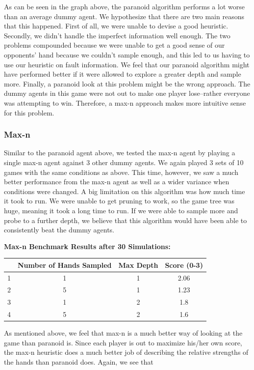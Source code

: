 \documentclass[11pt]{article}
\begin{document}
As can be seen in the graph above, the paranoid algorithm performs a lot worse than an average dummy agent. We hypothesize that there are two main reasons that this happened. First of all, we were unable to devise a good heuristic. Secondly, we didn't handle the imperfect information well enough. The two problems compounded because we were unable to get a good sense of our opponents' hand because we couldn't sample enough, and this led to us having to use our heuristic on fault information. We feel that our paranoid algorithm might have performed better if it were allowed to explore a greater depth and sample more. Finally, a paranoid look at this problem might be the wrong approach. The dummy agents in this game were not out to make one player lose--rather everyone was attempting to win. Therefore, a max-n approach makes more intuitive sense for this problem.

\subsubsection{Max-n}

Similar to the paranoid agent above, we tested the max-n agent by playing a single max-n agent against 3 other dummy agents. We again played 3 sets of 10 games with the same conditions as above. This time, however, we saw a much better performance from the max-n agent as well as a wider variance when conditions were changed. A big limitation on this algorithm was how much time it took to run. We were unable to get pruning to work, so the game tree was huge, meaning it took a long time to run. If we were able to sample more and probe to a further depth, we believe that this algorithm would have been able to consistently beat the dummy agents.

\begin{center}
\textbf{Max-n Benchmark Results after 30 Simulations:}\\
\begin{tabular}{ c|c|c|c } 
 \hline
  & Number of Hands Sampled & Max Depth & Score  (0-3)\\ 
\hline
 1 & 1 & 1 & 2.06\\
 2 & 5 & 1 & 1.23\\
 3 & 1 & 2 &  1.8\\ 
 4 & 5 & 2 & 1.6 \\

 \hline
\end{tabular}
\end{center}

As mentioned above, we feel that max-n is a much better way of looking at the game than paranoid is. Since each player is out to maximize his/her own score, the max-n heuristic does a much better job of describing the relative strengths of the hands than paranoid does. Again, we see that 
\end{document}
